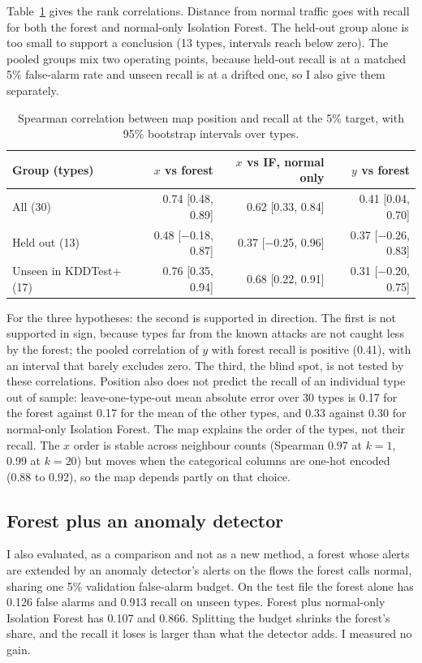 \documentclass[10pt]{article}
\begin{document}
Table~\ref{tab:map} gives the rank correlations. Distance from normal traffic goes with recall for both the
forest and normal-only Isolation Forest. The held-out group alone is too small to support a conclusion (13
types, intervals reach below zero). The pooled groups mix two operating points, because held-out recall is at a
matched 5\% false-alarm rate and unseen recall is at a drifted one, so I also give them separately.

\begin{table}[t]
\centering\small
\begin{tabular}{lrrr}
\toprule
Group (types) & $x$ vs forest & $x$ vs IF, normal only & $y$ vs forest\\
\midrule
All (30) & 0.74 [0.48, 0.89] & 0.62 [0.33, 0.84] & 0.41 [0.04, 0.70]\\
Held out (13) & 0.48 [$-$0.18, 0.87] & 0.37 [$-$0.25, 0.96] & 0.37 [$-$0.26, 0.83]\\
Unseen in KDDTest+ (17) & 0.76 [0.35, 0.94] & 0.68 [0.22, 0.91] & 0.31 [$-$0.20, 0.75]\\
\bottomrule
\end{tabular}
\caption{Spearman correlation between map position and recall at the 5\% target, with 95\% bootstrap
intervals over types.}
\label{tab:map}
\end{table}

For the three hypotheses: the second is supported in direction. The first is not supported in sign, because
types far from the known attacks are not caught less by the forest; the pooled correlation of $y$ with forest recall is
positive (0.41), with an interval that barely excludes zero. The third, the blind spot, is not tested by
these correlations. Position also does not predict the recall of an individual type out of sample: leave-one-type-out
mean absolute error over 30 types is 0.17 for the forest against 0.17 for the mean of the other types, and
0.33 against 0.30 for normal-only Isolation Forest. The map explains the order of the types, not their recall.
The $x$ order is stable across neighbour counts (Spearman 0.97 at $k=1$, 0.99 at $k=20$) but moves when the
categorical columns are one-hot encoded (0.88 to 0.92), so the map depends partly on that choice.

\subsection{Forest plus an anomaly detector}

I also evaluated, as a comparison and not as a new method, a forest whose alerts are extended by an anomaly detector's alerts
on the flows the forest calls normal, sharing one 5\% validation false-alarm budget. On the test file
the forest alone has 0.126 false alarms and 0.913 recall on unseen types. Forest plus normal-only Isolation
Forest has 0.107 and 0.866. Splitting the budget shrinks the forest's share, and the recall it loses is larger
than what the detector adds. I measured no gain.
\end{document}

